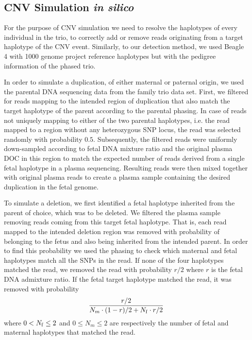 \subsection{CNV Simulation \emph{in silico}}\label{ss:simulation}
For the purpose of CNV simulation we need to resolve the haplotypes of every individual in the trio, to correctly add or remove reads originating from a target haplotype of the CNV event. Similarly, to our detection method, we used Beagle 4 \cite{browning2013} with 1000 genome project reference haplotypes but with the pedigree information of the phased trio.

	In order to simulate a duplication, of either maternal or paternal origin, we used the parental DNA sequencing data from the family trio data set. First, we filtered for reads mapping to the intended region of duplication that also match the target haplotype of the parent according to the parental phasing. In case of reads not uniquely mapping to either of the two parental haplotypes, i.e. the read mapped to a region without any heterozygous SNP locus, the read was selected randomly with probability $0.5$. Subsequently, the filtered reads were uniformly down-sampled according to fetal DNA mixture ratio and the original plasma DOC in this region to match the expected number of reads derived from a single fetal haplotype in a plasma sequencing. Resulting reads were then mixed together with original plasma reads to create a plasma sample containing the desired duplication in the fetal genome.
	
	To simulate a deletion, we first identified a fetal haplotype inherited from the parent of choice, which was to be deleted. We filtered the plasma sample removing reads coming from this target fetal haplotype. That is, each read mapped to the intended deletion region was removed with probability of belonging to the fetus and also being inherited from the intended parent. In order to find this probability we used the phasing to check which maternal and fetal haplotypes match all the SNPs in the read.  If none of the four haplotypes matched the read, we removed the read with probability $r/2$ where $r$ is the fetal DNA admixture ratio. If the fetal target haplotype matched the read, it was removed with probability
\begin{align*}
\frac{ r/2 } { N_m \cdot (1-r)/2 + N_{\mathrm{f}} \cdot r/2}
\end{align*}
where $0 < N_{\mathrm{f}} \leq 2$ and $0 \leq N_m \leq 2$ are respectively the number of fetal and maternal haplotypes that matched the read.
	
